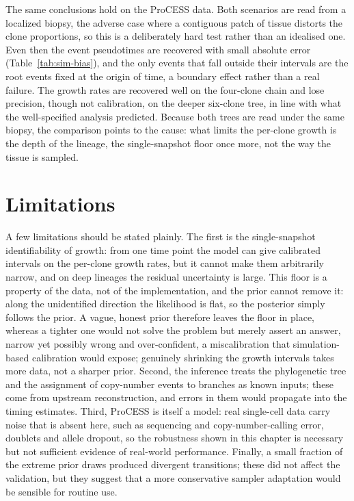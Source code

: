 The same conclusions hold on the ProCESS data. Both scenarios are read from a
localized biopsy, the adverse case where a contiguous patch of tissue distorts the
clone proportions, so this is a deliberately hard test rather than an idealised one.
Even then the event pseudotimes are recovered with small absolute error
(Table~\ref{tab:sim-bias}), and the only events that fall outside their intervals are
the root events fixed at the origin of time, a boundary effect rather than a real
failure. The growth rates are recovered well on the four-clone chain and lose
precision, though not calibration, on the deeper six-clone tree, in line with what
the well-specified analysis predicted. Because both trees are read under the same
biopsy, the comparison points to the cause: what limits the per-clone growth is the
depth of the lineage, the single-snapshot floor once more, not the way the tissue is
sampled.

\section{Limitations}

A few limitations should be stated plainly. The first is the single-snapshot
identifiability of growth: from one time point the model can give calibrated
intervals on the per-clone growth rates, but it cannot make them arbitrarily
narrow, and on deep lineages the residual uncertainty is large. This floor is a
property of the data, not of the implementation, and the prior cannot remove it:
along the unidentified direction the likelihood is flat, so the posterior simply
follows the prior. A vague, honest prior therefore leaves the floor in place, whereas
a tighter one would not solve the problem but merely assert an answer, narrow yet
possibly wrong and over-confident, a miscalibration that simulation-based calibration
would expose; genuinely shrinking the growth intervals takes more data, not a sharper
prior. Second, the
inference treats the phylogenetic tree and the assignment of copy-number events to
branches as known inputs; these come from upstream reconstruction, and errors in
them would propagate into the timing estimates. Third, ProCESS is itself a model:
real single-cell data carry noise that is absent here, such as sequencing and
copy-number-calling error, doublets and allele dropout, so the robustness shown in
this chapter is necessary but not sufficient evidence of real-world performance.
Finally, a small fraction of the extreme prior draws produced divergent
transitions; these did not affect the validation, but they suggest that a more
conservative sampler adaptation would be sensible for routine use.

